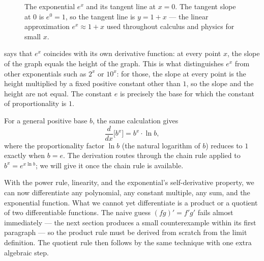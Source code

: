 \begin{figure}[H]
\centering
{}
\caption{The exponential \(e^{x}\) and its tangent line at \(x = 0\). The tangent slope at \(0\) is \(e^{0} = 1\), so the tangent line is \(y = 1 + x\) --- the linear approximation \(e^{x} \approx 1 + x\) used throughout calculus and physics for small \(x\).}
\label{fig:exp-tangent-at-zero}
\end{figure}

\begin{remark}
 says that \(e^{x}\) coincides with its own derivative function: at every point \(x\), the slope of the graph equals the height of the graph. This is what distinguishes \(e^{x}\) from other exponentials such as \(2^{x}\) or \(10^{x}\): for those, the slope at every point is the height multiplied by a fixed positive constant other than \(1\), so the slope and the height are not equal. The constant \(e\) is precisely the base for which the constant of proportionality is \(1\).
\end{remark}

\begin{remark}[Derivative of \(b^{x}\)]
For a general positive base \(b\), the same calculation gives
\[
\frac{d}{dx}\bigl[b^{x}\bigr] = b^{x} \cdot \ln b,
\]
where the proportionality factor \(\ln b\) (the natural logarithm of \(b\)) reduces to \(1\) exactly when \(b = e\). The derivation routes through the chain rule applied to \(b^{x} = e^{x \ln b}\); we will give it once the chain rule is available.
\end{remark}

With the power rule, linearity, and the exponential's self-derivative property, we can now differentiate any polynomial, any constant multiple, any sum, and the exponential function. What we cannot yet differentiate is a product or a quotient of two differentiable functions. The naive guess \((f g)' = f' g'\) fails almost immediately --- the next section produces a small counterexample within its first paragraph --- so the product rule must be derived from scratch from the limit definition. The quotient rule then follows by the same technique with one extra algebraic step.

